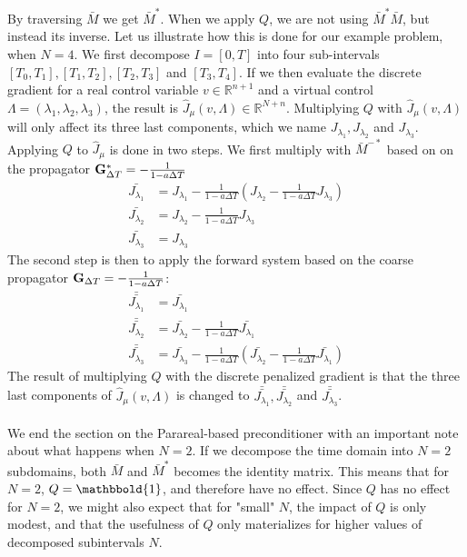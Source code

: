 \documentclass[11pt,a4paper]{article}
\begin{document}
By traversing $\bar M$ we get $\bar M^*$. When we apply $Q$, we are not using $\bar M^*\bar M$, but instead its inverse. Let us illustrate how this is done for our example problem, when $N=4$. We first decompose $I=[0,T]$ into four sub-intervals $[T_0,T_1], [T_1,T_2], [T_2,T_3]$ and $[T_3,T_4]$. If we then evaluate the discrete gradient for a real control variable $v\in\mathbb{R}^{n+1}$ and a virtual control $\Lambda =(\lambda_1,\lambda_2,\lambda_3)$, the result is $\hat J_{\mu}(v,\Lambda)\in\mathbb{R}^{N+n}$. Multiplying $Q$ with $\hat J_{\mu}(v,\Lambda)$ will only affect its three last components, which we name $J_{\lambda_1},J_{\lambda_2}$ and $J_{\lambda_3}$. Applying $Q$ to $\hat J_{\mu}$ is done in two steps. We first multiply with $\bar M^{-*}$ based on on the propagator $\bold G_{\Delta T}^*= -\frac{1}{1-a\Delta T} $ 
\begin{align*}
\bar{J_{\lambda_1}} &=J_{\lambda_1} -\frac{1}{1-a\Delta T}(J_{\lambda_2} -\frac{1}{1-a\Delta T}J_{\lambda_3})\\
\bar{J_{\lambda_2}} &=J_{\lambda_2} -\frac{1}{1-a\Delta T}J_{\lambda_3}\\
\bar{J_{\lambda_3}} &=J_{\lambda_3} 
\end{align*} 
The second step is then to apply the forward system based on the coarse propagator $\bold G_{\Delta T}= -\frac{1}{1-a\Delta T} $:
\begin{align*}
\bar{\bar{J_{\lambda_1}}}&=\bar{J_{\lambda_1}} \\
\bar{\bar{J_{\lambda_2}}}&=\bar{J_{\lambda_2}}-\frac{1}{1-a\Delta T}\bar{J_{\lambda_1}} \\
\bar{\bar{J_{\lambda_3}}}&=\bar{J_{\lambda_3}} -\frac{1}{1-a\Delta T}(\bar{J_{\lambda_2}}-\frac{1}{1-a\Delta T}\bar{J_{\lambda_1}})
\end{align*} 
The result of multiplying $Q$ with the discrete penalized gradient is that the three last components of $\hat J_{\mu}(v,\Lambda)$ is changed to $\bar{\bar{J_{\lambda_1}}},\bar{\bar{J_{\lambda_2}}}$ and $\bar{\bar{J_{\lambda_3}}}$. 
\\
\\
We end the section on the Parareal-based preconditioner with an important note about what happens when $N=2$. If we decompose the time domain into $N=2$ subdomains, both $\bar M$ and $\bar M^*$ becomes the identity matrix. This means that for $N=2$, $Q=\mathbbold{1}$, and therefore have no effect. Since $Q$ has no effect for $N=2$, we might also expect that for "small" $N$, the impact of $Q$ is only modest, and that the usefulness of $Q$ only materializes for higher values of decomposed subintervals $N$.
\end{document}
